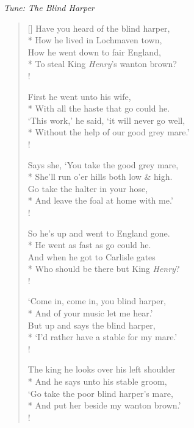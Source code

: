 \documentclass[MAIN]{subfiles}
\begin{document}
\bigskip

\begin{center}
{\it Tune: The Blind Harper}
\end{center}

\bigskip

\settowidth{\versewidth}{`This work,' he said, `it will never go well,}
\begin{verse}[\versewidth]
Have you heard of the blind harper,\\*
\vin How he lived in {\sc Lochmaven} town,\\
How he went down to fair England,\\*
\vin To steal King \emph{Henry}'s wanton brown?\\!

First he went unto his wife,\\*
\vin With all the haste that go could he.\\
`This work,' he said, `it will never go well,\\*
\vin Without the help of our good grey mare.'\\!

Says she, `You take the good grey mare,\\*
\vin She'll run o'er hills both low \& high.\\
Go take the halter in your hose,\\*
\vin And leave the foal at home with me.'\\!

So he's up and went to England gone.\\*
\vin He went as fast as go could he.\\
And when he got to {\sc Carlisle} gates\\*
\vin Who should be there but King \emph{Henry}?\\!

`Come in, come in, you blind harper,\\*
\vin And of your music let me hear.'\\
But up and says the blind harper,\\*
\vin `I'd rather have a stable for my mare.'\\!

The king he looks over his left shoulder\\*
\vin And he says unto his stable groom,\\
`Go take the poor blind harper's mare,\\*
\vin And put her beside my wanton brown.'\\!


\end{verse}
\end{document}
